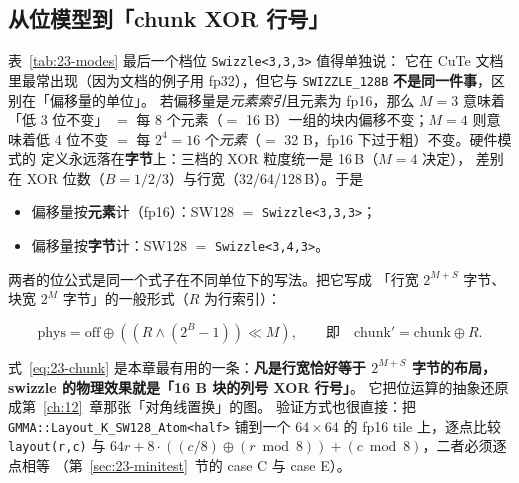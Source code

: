 \subsection{从位模型到「chunk XOR 行号」}

表~\ref{tab:23-modes} 最后一个档位 \texttt{Swizzle\allowbreak{}<3,\allowbreak{}3,\allowbreak{}3>} 值得单独说：
它在 CuTe 文档里最常出现（因为文档的例子用 fp32），但它与
\texttt{SWIZZLE\_\allowbreak{}128\allowbreak{}B} \textbf{不是同一件事}，区别在「偏移量的单位」。
若偏移量是\emph{元素索引}且元素为 fp16，那么 $M=3$ 意味着「低 3 位不变」
$=$ 每 8 个元素（$=$ 16 B）一组的块内偏移不变；$M=4$ 则意味着低 4 位不变
$=$ 每 $2^4=16$ 个\emph{元素}（$=$ 32 B，fp16 下过于粗）不变。硬件模式的
定义永远落在\textbf{字节}上：三档的 XOR 粒度统一是 16\,B（$M=4$ 决定），
差别在 XOR 位数（$B=1/2/3$）与行宽（32/64/128\,B）。于是

\begin{itemize}[leftmargin=2em]
\item 偏移量按\textbf{元素}计（fp16）：SW128 $=$ \texttt{Swizzle\allowbreak{}<3,\allowbreak{}3,\allowbreak{}3>}；
\item 偏移量按\textbf{字节}计：SW128 $=$ \texttt{Swizzle\allowbreak{}<3,\allowbreak{}4,\allowbreak{}3>}。
\end{itemize}

两者的位公式是同一个式子在不同单位下的写法。把它写成
「行宽 $2^{M+S}$ 字节、块宽 $2^M$ 字节」的一般形式（$R$ 为行索引）：

\begin{equation}
\label{eq:23-chunk}
\text{phys} = \text{off} \oplus \left(\left(R \wedge (2^B-1)\right)
\ll M\right),
\qquad \text{即}\quad \text{chunk}' = \text{chunk} \oplus R .
\end{equation}

式~\eqref{eq:23-chunk} 是本章最有用的一条：\textbf{凡是行宽恰好等于
$2^{M+S}$ 字节的布局，swizzle 的物理效果就是「16 B 块的列号 XOR 行号」}。
它把位运算的抽象还原成第~\ref{ch:12}~章那张「对角线置换」的图。
验证方式也很直接：把 \texttt{GMMA::\allowbreak{}Layout\_\allowbreak{}K\_\allowbreak{}SW128\_\allowbreak{}Atom\allowbreak{}<half>} 铺到一个
$64\times64$ 的 fp16 tile 上，逐点比较 \texttt{layout(r,c)} 与
$64r+8\cdot((c/8)\oplus(r\bmod 8))+(c\bmod 8)$，二者必须逐点相等
（第~\ref{sec:23-minitest}~节的 case C 与 case E）。

